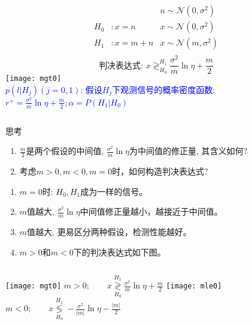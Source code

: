 \begin{frame}
\begin{columns}
	\begin{align*}
	&&n\sim\mathcal{N}(0,\sigma^2)\\ 
	H_0 &:x=n   &x\sim\mathcal{N}(0,\sigma^2)\\
	H_1 &:x=m+n &x\sim\mathcal{N}(m,\sigma^2)\\
	\end{align*}
	\[\text{判决表达式:  } x\mathop{\gtrless}_{H_0}^{H_1}\frac{\sigma^2}{m}\ln\eta+\frac{m}{2} \]
	\texttt{[image: mgt0]}\\
	\scriptsize
	\textcolor{blue}{$p(l|H_j)(j=0,1)$: 假设$H_j$下观测信号的概率密度函数; $r^+=\frac{\sigma^2}{m}\ln\eta+\frac{m}{2}; \alpha=P(H_1|H_0)$}
\end{columns}
\begin{block}{思考}
	\begin{enumerate}
		\item $\frac{m}{2}$是两个假设的中间值, $\frac{\sigma^2}{m}\ln\eta$为中间值的修正量, 其含义如何?
		\item 考虑$m>0,m<0,m=0$时，如何构造判决表达式?
	\end{enumerate} 
\end{block}
\end{frame}

\begin{frame}
\begin{enumerate}
	\item $m=0$时: $H_0,H_1$成为一样的信号。
	\item $m$值越大, $\frac{\sigma^2}{m}\ln\eta$中间值修正量越小，越接近于中间值。
	\item $m$值越大, 更易区分两种假设，检测性能越好。
	\item $m>0$和$m<0$下的判决表达式如下图。
\end{enumerate}	
\begin{columns}
	\texttt{[image: mgt0]}
	$m>0;\qquad x\mathop{\gtrless}\limits_{H_0}^{H_1}\frac{\sigma^2}{m}\ln\eta+\frac{m}{2}$
	\texttt{[image: mle0]}
	$m<0;\qquad x\mathop{\lessgtr}\limits_{H_0}^{H_1}-\frac{\sigma^2}{|m|}\ln\eta-\frac{|m|}{2}$
\end{columns}
\end{frame}

